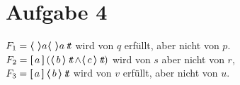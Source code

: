 \section*{Aufgabe 4}

$F_1 = \poss {a} \poss {a} \true$ wird von $q$ erfüllt, aber nicht von $p$.\\
$F_2 = \necess{a} (\poss{b} \true \land \poss{c} \true)$ wird von $s$ aber nicht von $r$,\\
$F_3 = \necess{a} \poss{b} \true$ wird von $v$ erfüllt, aber nicht von $u$.

